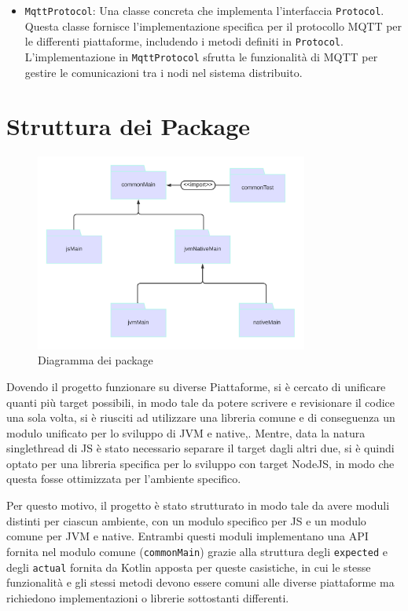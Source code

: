 \documentclass[12pt,a4paper,openright,twoside]{book}
\begin{document}
\begin{itemize}
    \item \texttt{MqttProtocol}: Una classe concreta che implementa l'interfaccia \texttt{Protocol}. Questa classe fornisce l'implementazione 
    specifica per il protocollo MQTT per le differenti piattaforme, includendo i metodi definiti in \texttt{Protocol}.
    L'implementazione in \texttt{MqttProtocol} sfrutta le funzionalità di \ac{MQTT} per gestire le comunicazioni tra i nodi nel sistema distribuito.

\end{itemize}


\section{Struttura dei Package}
\begin{figure}[H]
    \centering
    \includegraphics[width=0.8\textwidth]{figures/package-diagram.png}
    \caption{Diagramma dei package}
    \label{fig:diagramma-package}
\end{figure}

Dovendo il progetto funzionare su diverse Piattaforme, si è cercato di unificare quanti più target possibili, in modo tale da potere scrivere e revisionare il codice una sola volta,
si è riusciti ad utilizzare una libreria comune e di conseguenza un modulo unificato per lo sviluppo di \ac{JVM} e native,.
Mentre, data la natura singlethread di \ac{JS} è stato necessario separare il target dagli altri due, si è quindi optato per una libreria specifica 
per lo sviluppo con target NodeJS, in modo che questa fosse ottimizzata per l'ambiente specifico. 

Per questo motivo, il progetto è stato strutturato in modo tale da avere moduli distinti per ciascun ambiente, con un modulo specifico per \ac{JS} 
e un modulo comune per \ac{JVM} e native.  Entrambi questi moduli implementano una API fornita nel modulo comune (\texttt{commonMain}) grazie
alla struttura degli \texttt{expected} e degli \texttt{actual} fornita da Kotlin apposta per queste casistiche, in cui le stesse funzionalità
e gli stessi metodi devono essere comuni alle diverse piattaforme ma richiedono implementazioni o librerie sottostanti differenti.
\end{document}
